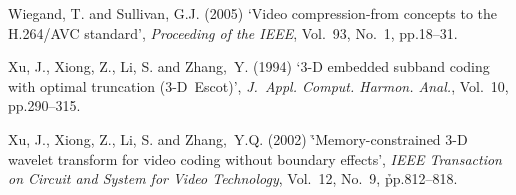 \documentclass{doublecol-new}
\theoremstyle{TH}{
\newtheorem{lemma}{Lemma}[section]
\newtheorem{theorem}{Theorem}
\newtheorem{corrolary}{Corrolary}
\newtheorem{conjecture}[lemma]{Conjecture}
\newtheorem{proposition}[lemma]{Proposition}
\newtheorem{claim}[lemma]{Claim}
\newtheorem{stheorem}[lemma]{Wrong Theorem}
}
\theoremstyle{THrm}{
\newtheorem{definition}{Definition}[section]
\newtheorem{question}{Question}[section]
\newtheorem{remark}{Remark}[section]
\newtheorem{scheme}{Scheme}
}
\theoremstyle{THhit}{
\newtheorem{case}{Case}[section]
}
\begin{document}
\begin{thebibliography}{10}
Wiegand, T. and Sullivan, G.J. (2005) `Video compression-from concepts to the
H.264/AVC standard', {\it Proceeding of the IEEE}, Vol.~93, No.~1, pp.18--31.

Xu, J., Xiong, Z., Li, S. and Zhang,~Y. (1994) `3-D embedded subband coding with
optimal truncation (3-D~Escot)', {\it J.~Appl. Comput. Harmon. Anal.}, Vol.~10,
pp.290--315.

Xu, J., Xiong, Z., Li, S. and Zhang,~Y.Q. (2002) \h{`Memory-constrained} 3-D
wavelet transform for video coding without boundary effects', {\it IEEE
Transaction on Circuit and System for Video Technology}, Vol.~12, No.~9,
\h{pp.812--818}.

\end{thebibliography}

\def\notesname{Note}

\theendnotes

%
\end{document}
